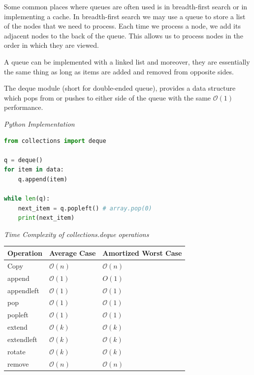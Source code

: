\documentclass{article}
\newcommand{\bigO}{\mathcal{O}}
\begin{document}
    Some common places where queues are often used is in breadth-first search or in implementing a cache. In breadth-first search we may use a queue to store a list of the nodes that we need to process. Each time we process a node, we add its adjacent nodes to the back of the queue. This allows us to process nodes in the order in which they are viewed. 
    
    A queue can be implemented with a linked list and moreover, they are essentially the same thing as long as items are added and removed from opposite sides.
    
    The deque module (short for double-ended queue), provides a data structure which pops from or pushes to either side of the queue with the same $\bigO(1)$ performance. 
    
\vspace{8pt} \emph{Python Implementation}
\begin{lstlisting}[language=Python]
from collections import deque 

q = deque() 
for item in data:
    q.append(item) 
 
while len(q):
    next_item = q.popleft() # array.pop(0)
    print(next_item)

\end{lstlisting}

    \vspace{8pt} \emph{Time Complexity of collections.deque operations}
    \begin{table}[H]
        \begin{tabular}{|l|l|l|}
            \hline
            \textbf{Operation} & \textbf{Average Case} & \textbf{Amortized Worst Case} \\
            \hline
            Copy & $\bigO(n)$ & $\bigO(n)$ \\
            append & $\bigO(1)$ & $O(1)$ \\
            appendleft & $\bigO(1)$ & $\bigO(1)$ \\
            pop & $\bigO(1)$ & $\bigO(1)$ \\
            popleft & $\bigO(1)$ & $\bigO(1)$ \\
            extend & $\bigO(k)$ & $\bigO(k)$ \\
            extendleft & $\bigO(k)$ & $\bigO(k)$ \\
            rotate & $\bigO(k)$ & $\bigO(k)$\\
            remove & $\bigO(n)$ & $\bigO(n)$\\
            \hline
        \end{tabular}
    \end{table}
\end{document}
